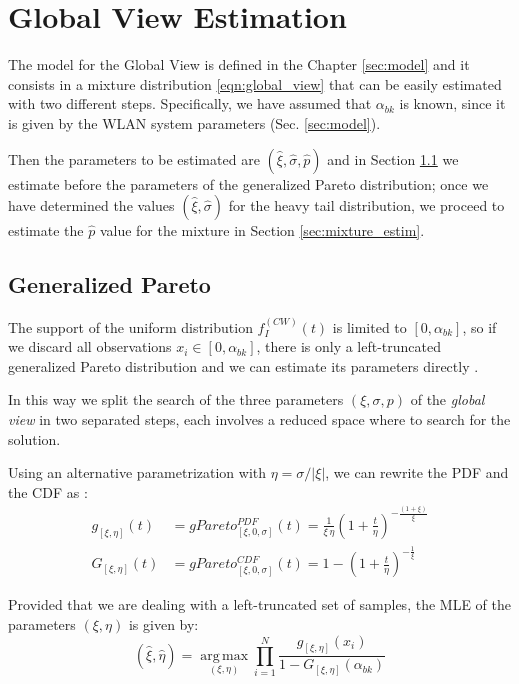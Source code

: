 \chapter{Global View Estimation} \label{sec:global}

The model for the Global View is defined in the Chapter \ref{sec:model} and it consists in a mixture distribution \eqref{eqn:global_view} that can be easily estimated with two different steps. Specifically, we have assumed that $\alpha_{bk}$ is known, since it is given by the \ac{WLAN} system parameters (Sec. \ref{sec:model}).

Then the parameters to be estimated are $(\hat{\xi},\hat{\sigma}, \hat{p})$ and in Section \ref{sec:global_pareto} we estimate before the parameters of the generalized Pareto distribution; once we have determined the values $(\hat{\xi},\hat{\sigma})$ for the heavy tail distribution, we proceed to estimate the $\hat{p}$ value for the mixture in Section \ref{sec:mixture_estim}.

\section{Generalized Pareto} \label{sec:global_pareto}

The support of the uniform distribution $f^{(CW)}_I(t)$ is limited to $[0,\alpha_{bk}]$, so if we discard all observations $x_i \in [0,\alpha_{bk}]$, there is only a left-truncated generalized Pareto distribution and we can estimate its parameters directly \cite{DSA-Emp}.

In this way we split the search of the three parameters $(\xi, \sigma, p)$ of the \textit{global view} in two separated steps, each involves a reduced space where to search for the solution.

Using an alternative parametrization with $\eta = \sigma / |\xi|$, we can rewrite the \ac{PDF} and the \ac{CDF} as \cite{gParetoEst}:
\begin{subequations}
	\begin{align}
		g_{[\xi, \eta]}(t) &= gPareto_{[\xi,0,\sigma]}^{PDF}(t) =
			\frac{1}{\xi\, \eta}\left(1 + \frac{t}{\eta} \right)^{-\frac{\left(1 + \xi \right)}{\xi}} \\
		G_{[\xi, \eta]}(t) &= gPareto_{[\xi,0,\sigma]}^{CDF}(t) =
			1 - \left(1 + \frac{t}{\eta}\right)^{-\frac{1}{\xi}}
	\end{align}
\end{subequations}

Provided that we are dealing with a left-truncated set of samples, the \acf{MLE} \cite{MLE,gParetoMLE} of the parameters $(\xi, \eta)$ is given by:
\begin{equation}
	(\hat{\xi}, \hat{\eta}) = \operatorname*{arg\,max}_{(\xi, \eta)}
		\prod_{i = 1}^{N} \frac{g_{[\xi, \eta]}(x_i)}{1 - G_{[\xi, \eta]}(\alpha_{bk})}
\end{equation}

